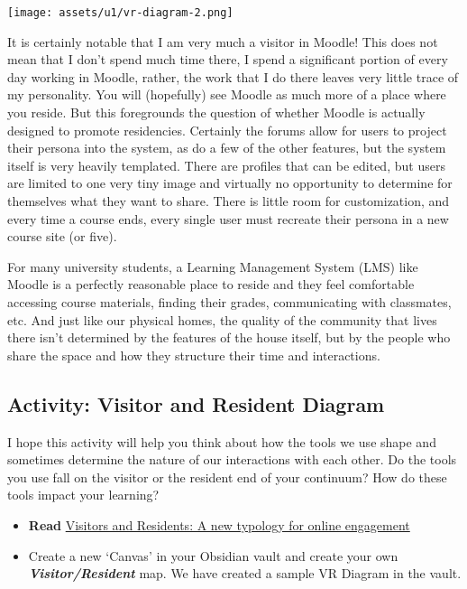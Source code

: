 \documentclass[
]{book}
\providecommand{\tightlist}{%
  \setlength{\itemsep}{0pt}\setlength{\parskip}{0pt}}
\theoremstyle{definition}
\theoremstyle{definition}
\theoremstyle{definition}
\theoremstyle{definition}
\theoremstyle{remark}
\begin{document}
\texttt{[image: assets/u1/vr-diagram-2.png]}

It is certainly notable that I am very much a visitor in Moodle! This does not mean that I don't spend much time there, I spend a significant portion of every day working in Moodle, rather, the work that I do there leaves very little trace of my personality. You will (hopefully) see Moodle as much more of a place where you reside. But this foregrounds the question of whether Moodle is actually designed to promote residencies. Certainly the forums allow for users to project their persona into the system, as do a few of the other features, but the system itself is very heavily templated. There are profiles that can be edited, but users are limited to one very tiny image and virtually no opportunity to determine for themselves what they want to share. There is little room for customization, and every time a course ends, every single user must recreate their persona in a new course site (or five).

For many university students, a Learning Management System (LMS) like Moodle is a perfectly reasonable place to reside and they feel comfortable accessing course materials, finding their grades, communicating with classmates, etc. And just like our physical homes, the quality of the community that lives there isn't determined by the features of the house itself, but by the people who share the space and how they structure their time and interactions.

\hypertarget{activity-visitor-and-resident-diagram}{%
\subsection*{Activity: Visitor and Resident Diagram}\label{activity-visitor-and-resident-diagram}}

\begin{reflect}
I hope this activity will help you think about how the tools we use shape and sometimes determine the nature of our interactions with each other. Do the tools you use fall on the visitor or the resident end of your continuum? How do these tools impact your learning?

\begin{itemize}
\tightlist
\item
  \textbf{Read} \href{https://firstmonday.org/ojs/index.php/fm/article/view/3171}{Visitors and Residents: A new typology for online engagement}\\
\item
  Create a new `Canvas' in your Obsidian vault and create your own \textbf{\emph{Visitor/Resident}} map. We have created a sample VR Diagram in the vault.
\end{itemize}
\end{reflect}
\end{document}
